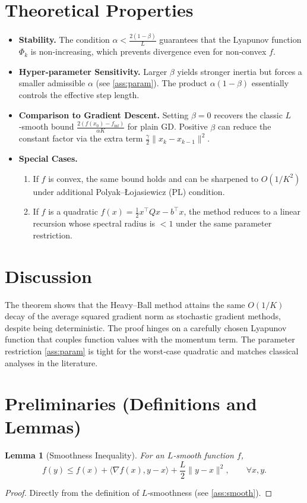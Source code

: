 \documentclass{article}
\newtheorem{lemma}{Lemma}
\newcommand{\grad}{\nabla}
\begin{document}
\section*{Theoretical Properties}
\begin{itemize}[leftmargin=*]
    \item \textbf{Stability.} The condition $\alpha<\frac{2(1-\beta)}{L}$ guarantees that the Lyapunov function $\Phi_k$ is non‑increasing, which prevents divergence even for non‑convex $f$.
    \item \textbf{Hyper‑parameter Sensitivity.} Larger $\beta$ yields stronger inertia but forces a smaller admissible $\alpha$ (see \ref{ass:param}). The product $\alpha(1-\beta)$ essentially controls the effective step length.
    \item \textbf{Comparison to Gradient Descent.} Setting $\beta=0$ recovers the classic $L$‑smooth bound $ \frac{2(f(x_0)-f_{\inf})}{\alpha K}$ for plain GD. Positive $\beta$ can reduce the constant factor via the extra term $ \frac{\gamma}{2}\|x_k-x_{k-1}\|^2$.
    \item \textbf{Special Cases.}
    \begin{enumerate}
        \item If $f$ is convex, the same bound holds and can be sharpened to $O(1/K^2)$ under additional Polyak–Łojasiewicz (PL) condition.
        \item If $f$ is a quadratic $f(x)=\frac12 x^\top Q x-b^\top x$, the method reduces to a linear recursion whose spectral radius is $<1$ under the same parameter restriction.
    \end{enumerate}
\end{itemize}

\section*{Discussion}
The theorem shows that the Heavy–Ball method attains the same $O(1/K)$ decay of the average squared gradient norm as stochastic gradient methods, despite being deterministic. The proof hinges on a carefully chosen Lyapunov function that couples function values with the momentum term. The parameter restriction \ref{ass:param} is tight for the worst‑case quadratic and matches classical analyses in the literature.

\newpage
\section*{Preliminaries (Definitions and Lemmas)}
\begin{lemma}[Smoothness Inequality]\label{lem:smooth}
For an $L$‑smooth function $f$,
\[
f(y) \le f(x) + \langle \grad f(x),y-x\rangle + \frac{L}{2}\|y-x\|^2,\qquad\forall x,y.
\]
\end{lemma}
\begin{proof}
Directly from the definition of $L$‑smoothness (see \ref{ass:smooth}). \hfill\qedsymbol
\end{proof}
\end{document}
